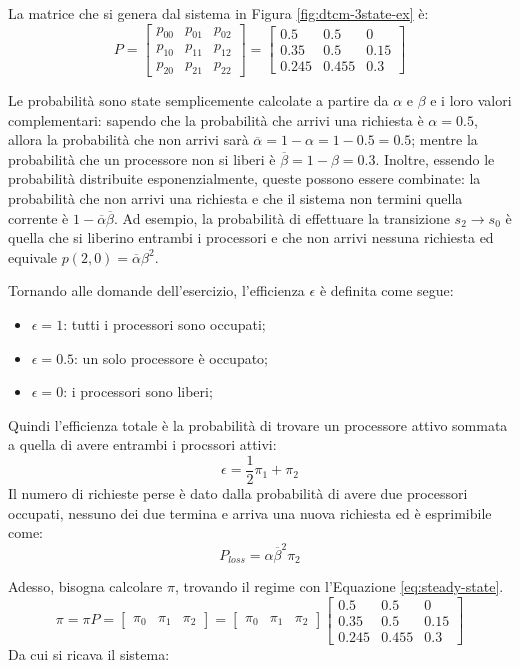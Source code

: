 \documentclass{article}
\begin{document}
La matrice che si genera dal sistema in Figura \ref{fig:dtcm-3state-ex} è:
\[
  P = \begin{bmatrix} 
    p_{00} & p_{01} & p_{02} \\
    p_{10} & p_{11} & p_{12} \\
    p_{20} & p_{21} & p_{22} 
  \end{bmatrix} = 
  \begin{bmatrix} 
    0.5 & 0.5 & 0 \\
    0.35 & 0.5 & 0.15 \\
    0.245 & 0.455 & 0.3
  \end{bmatrix}
\]

Le probabilità sono state semplicemente calcolate a partire da $\alpha$ e $\beta$ e i loro
valori complementari: sapendo che la probabilità che arrivi una richiesta è $\alpha = 0.5$, 
allora la probabilità che non arrivi sarà $\overline{\alpha} = 1 - \alpha = 1- 0.5 = 0.5$; 
mentre la probabilità che un processore non si liberi è $\overline{\beta} = 1 - \beta = 0.3$.
Inoltre, essendo le probabilità distribuite esponenzialmente, queste possono essere 
combinate: la probabilità che non arrivi una richiesta e che il sistema non termini quella
corrente è $1-\overline{\alpha}\overline{\beta}$. Ad esempio, la probabilità di effettuare
la transizione $s_2 \to s_0$ è quella che si liberino entrambi i processori e che non
arrivi nessuna richiesta ed equivale $p(2,0) = \overline{\alpha}\beta^2$.

Tornando alle domande dell'esercizio, l'efficienza $\epsilon$ è definita come segue:
\begin{itemize}
  \item $\epsilon=1$: tutti i processori sono occupati;
  \item $\epsilon=0.5$: un solo processore è occupato;
  \item $\epsilon=0$: i processori sono liberi;
\end{itemize}

Quindi l'efficienza totale è la probabilità di trovare un processore attivo sommata a quella
di avere entrambi i procssori attivi:
\[
  \epsilon = \frac{1}{2} \pi_1 + \pi_2
\]
Il numero di richieste perse è dato dalla probabilità di avere due processori occupati, 
nessuno dei due termina e arriva una nuova richiesta ed è esprimibile come:
\[
  P_{loss} = \alpha\overline{\beta}^2\pi_2
\]

Adesso, bisogna calcolare $\pi$, trovando il regime con l'Equazione \ref{eq:steady-state}. 
\[
  \pi = \pi P = \begin{bmatrix}
  \pi_0 & \pi_1 & \pi_2\end{bmatrix}
  = 
  \begin{bmatrix}
    \pi_0 & \pi_1 & \pi_2
  \end{bmatrix}
  \begin{bmatrix} 
    0.5 & 0.5 & 0 \\
    0.35 & 0.5 & 0.15 \\
    0.245 & 0.455 & 0.3
  \end{bmatrix}
\]
Da cui si ricava il sistema:
\end{document}
